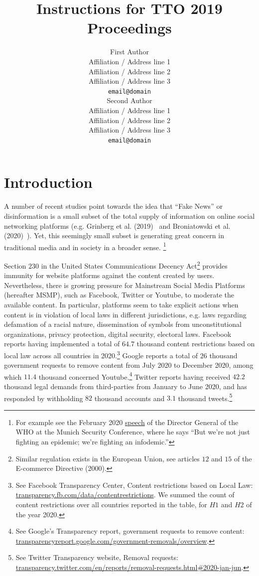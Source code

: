 \documentclass[11pt,a4paper]{article}
\title{Instructions for TTO 2019 Proceedings}
\author{First Author \\
  Affiliation / Address line 1 \\
  Affiliation / Address line 2 \\
  Affiliation / Address line 3 \\
  \texttt{email@domain} \\\And
  Second Author \\
  Affiliation / Address line 1 \\
  Affiliation / Address line 2 \\
  Affiliation / Address line 3 \\
  \texttt{email@domain} \\}
\date{}
\begin{document}
\maketitle
\begin{abstract}

\end{abstract}

\section{Introduction}

A number of recent studies  point towards the idea that ``Fake News'' or disinformation is a small subset of the total supply of information on online social networking platforms (e.g. Grinberg et al. (2019)~\cite{grinberg} and Broniatowski et al. (2020)~\cite{broniatowski}). Yet, this seemingly small subset is generating great concern in traditional media and in society in a broader sense. \footnote{For example see the February 2020 \href{https://www.who.int/director-general/speeches/detail/munich-security-conference}{speech} of the Director General of the WHO at the Munich Security Conference, where he says ``But we’re not just fighting an epidemic; we’re fighting an infodemic.''  }

Section $230$ in the United States Communications Decency Act\footnote{Similar regulation exists in the European Union, see articles $12$ and $15$ of the E-commerce Directive (2000). } provides immunity for website platforms against the content created by users. Nevertheless, there is growing pressure for Mainstream Social Media Platforms (hereafter MSMP), such as Facebook, Twitter or Youtube, to moderate the available content. In particular, platforms seem to take explicit actions when content is in violation of local laws in different jurisdictions, e.g. laws regarding defamation of a racial nature, dissemination of symbols from unconstitutional organizations, privacy protection, digital security, electoral laws. Facebook reports having implemented a total of $64.7$ thousand content restrictions based on local law across all countries in 2020.\footnote{See Facebook Transparency Center, Content restrictions based on Local Law: \href{https://transparency.fb.com/data/content\-restrictions}{transparency.fb.com/data/content\-restrictions}. We summed the count of content restrictions over all countries reported in the table, for $H1$ and $H2$ of the year 2020.} Google reports a total of $26$ thousand government requests to remove content from July 2020 to December 2020, among which $11.4$ thousand concerned Youtube.\footnote{See Google's Transparency report, government requests to remove content: \href{https://transparencyreport.google.com/government-removals/overview}{transparencyreport.google.com/government-removals/overview}.} Twitter reports having received $42.2$ thousand legal demands from third-parties from January to June 2020, and has responded by withholding $82$ thousand accounts and $3.1$ thousand tweets.\footnote{See Twitter Transparency website, Removal requests: \href{https://transparency.twitter.com/en/reports/removal-requests.html\#2020-jan-jun}{transparency.twitter.com/en/reports/removal-requests.html\#2020-jan-jun}.} 
\end{document}
